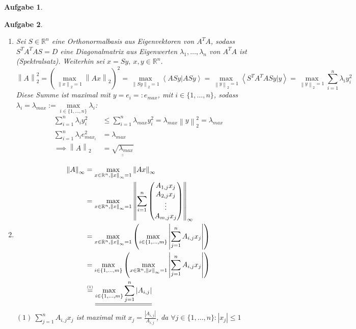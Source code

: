\documentclass[11pt]{article}
\theoremstyle{break}
\newtheorem{task}{Aufgabe}
\newcommand{\set}[1]{\ensuremath{\{#1\}}}
\newcommand{\abs}[1]{\ensuremath{\left\vert #1 \right\vert}}
\newcommand{\norm}[1]{\ensuremath{\left\| #1 \right\|}}
\newcommand{\skal}[2]{\ensuremath{\left\langle #1 | #2 \right\rangle}}
\newcommand{\R}{\ensuremath{\mathbb{R}}}
\begin{document}
\newpage
\begin{task}
    \hfill\vspace{-5mm}
    
\end{task}
\newpage
\begin{task}
    \hfill\vspace{-5mm}
    \begin{enumerate} [label={(\alph*)}]
        \item Sei $S\in \R^n$ eine Orthonormalbasis aus Eigenvektoren von $A^TA$, sodass $S^TA^TAS=D$ eine Diagonalmatrix aus Eigenwerten $\lambda_1, \dots, \lambda_n$ von $A^TA$ ist (Spektralsatz). Weiterhin sei $x = Sy,\ x,y\in\R^n$.
        $$\norm{A}_2^2 = (\max\limits_{\norm{x}_2 = 1} \norm{Ax}_2)^2 = \max\limits_{\norm{Sy}_2 = 1} \skal{ASy}{ASy} = \max\limits_{\norm{y}_2 = 1} \skal{S^TA^TASy}{y} = \max\limits_{\norm{y}_2 = 1} \sum\limits_{i=1}^n \lambda_i y_i^2$$
        Diese Summe ist maximal mit $y=e_i=:e_{max}$, mit $i\in \set{1,\dots, n}$, sodass $\lambda_i = \lambda_{max} := \max\limits_{i\in\set{1,\dots,n}} \lambda_i$:
        \begin{align*}
            \sum\limits_{i=1}^n \lambda_i y_i^2&\leq \sum\limits_{i=1}^n \lambda_{max} y_i^2 = \lambda_{max} \norm{y}_2^2 = \lambda_{max}\\
            \sum\limits_{i=1}^n \lambda_i e_{max_i}^2 &= \lambda_{max}\\
            \implies \norm{A}_2 &= \underline{\underline{\sqrt{\lambda_{max}}}}
        \end{align*}
        \item \begin{align*}
            \norm{A}_\infty &= \max\limits_{x\in \R^n, \norm{x}_\infty = 1}\norm{Ax}_\infty\\
            &= \max\limits_{x\in \R^n, \norm{x}_\infty = 1}\norm{\sum\limits_{i=1}^n\left(
            \begin{matrix}
                A_{1,j}x_j\\
                A_{2,j}x_j\\
                \vdots\\
                A_{m,j}x_j
            \end{matrix}
            \right)}_\infty\\
            &= \max\limits_{x\in \R^n, \norm{x}_\infty = 1}\left(\max\limits_{i\in\set{1,\dots,m}}\abs{\sum\limits_{j=1}^n A_{i,j}x_j}\right)\\
            &= \max\limits_{i\in\set{1,\dots,m}}\left(\max\limits_{x\in \R^n, \norm{x}_\infty = 1}\abs{\sum\limits_{j=1}^n A_{i,j}x_j}\right)\\
            &\stackrel{\mbox{\tiny (1)}}{=} \underline{\underline{\max\limits_{i\in\set{1,\dots,m}}\sum\limits_{j=1}^n \abs{A_{i,j}}}}
        \end{align*}
        $(1)\ \sum\limits_{j=1}^n A_{i,j}x_j$ ist maximal mit $x_j = \frac{\abs{A_{i,j}}}{A_{i,j}}$, da $\forall j\in\set{1,\dots,n}:\abs{x_j}\leq 1$
    \end{enumerate}
\end{task}
\end{document}
